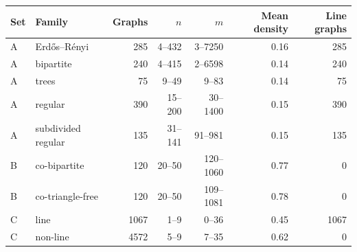 \begin{tabular}{llrrrrr}
\toprule
Set & Family & Graphs & $n$ & $m$ & Mean density & Line graphs\\
\midrule
A & Erd\H{o}s--R\'enyi & 285 & 4--432 & 3--7250 & 0.16 & 285\\
A & bipartite & 240 & 4--415 & 2--6598 & 0.14 & 240\\
A & trees & 75 & 9--49 & 9--83 & 0.14 & 75\\
A & regular & 390 & 15--200 & 30--1400 & 0.15 & 390\\
A & subdivided regular & 135 & 31--141 & 91--981 & 0.15 & 135\\
\midrule
B & co-bipartite & 120 & 20--50 & 120--1060 & 0.77 & 0\\
B & co-triangle-free & 120 & 20--50 & 109--1081 & 0.78 & 0\\
\midrule
C & line & 1067 & 1--9 & 0--36 & 0.45 & 1067\\
C & non-line & 4572 & 5--9 & 7--35 & 0.62 & 0\\
\bottomrule
\end{tabular}
